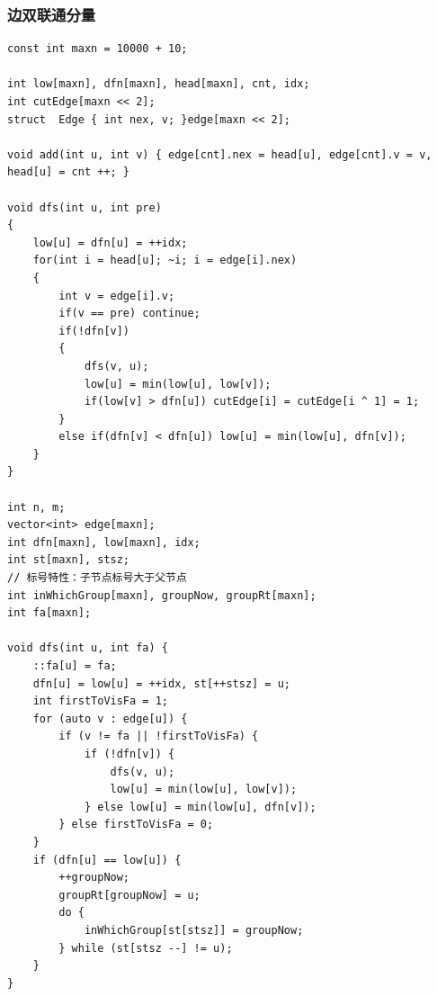\documentclass[twoside]{article}
\begin{document}
\subsubsection{边双联通分量}
\begin{lstlisting}
const int maxn = 10000 + 10;

int low[maxn], dfn[maxn], head[maxn], cnt, idx;
int cutEdge[maxn << 2];
struct  Edge { int nex, v; }edge[maxn << 2];

void add(int u, int v) { edge[cnt].nex = head[u], edge[cnt].v = v, head[u] = cnt ++; }

void dfs(int u, int pre)
{
	low[u] = dfn[u] = ++idx;
	for(int i = head[u]; ~i; i = edge[i].nex)
	{
		int v = edge[i].v;
		if(v == pre) continue;
		if(!dfn[v])
		{
			dfs(v, u);
			low[u] = min(low[u], low[v]);
			if(low[v] > dfn[u]) cutEdge[i] = cutEdge[i ^ 1] = 1;
		}
		else if(dfn[v] < dfn[u]) low[u] = min(low[u], dfn[v]);
	}
}

int n, m;
vector<int> edge[maxn];
int dfn[maxn], low[maxn], idx;
int st[maxn], stsz;
// 标号特性：子节点标号大于父节点
int inWhichGroup[maxn], groupNow, groupRt[maxn];
int fa[maxn];

void dfs(int u, int fa) {
    ::fa[u] = fa;
    dfn[u] = low[u] = ++idx, st[++stsz] = u;
    int firstToVisFa = 1;
    for (auto v : edge[u]) {
        if (v != fa || !firstToVisFa) {
            if (!dfn[v]) {
                dfs(v, u);
                low[u] = min(low[u], low[v]);
            } else low[u] = min(low[u], dfn[v]);
        } else firstToVisFa = 0;
    }
    if (dfn[u] == low[u]) {
        ++groupNow;
        groupRt[groupNow] = u;
        do {
            inWhichGroup[st[stsz]] = groupNow;
        } while (st[stsz --] != u);
    }
}\end{lstlisting}
\end{document}
